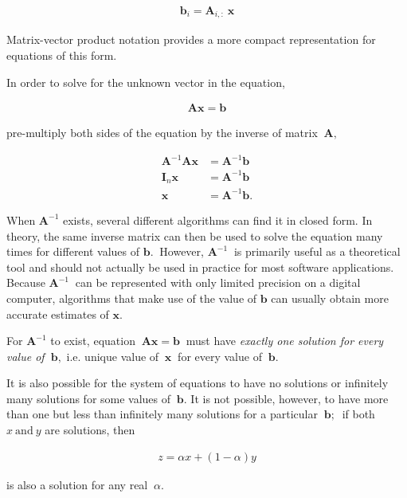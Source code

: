 \documentclass[12pt]{article}
\begin{document}
\begin{align}
\mathbf{b}_{i} = \mathbf{A}_{i,:}\ \mathbf{x}
\end{align}

Matrix-vector product notation provides a more compact representation for equations of this form.

In order to solve for the unknown vector in the equation,

\begin{align}
\mathbf{A}\mathbf{x}=\mathbf{b}
\end{align}

pre-multiply both sides of the equation by the inverse of matrix $\ \mathbf{A},$

\begin{align}
\mathbf{A}^{-1}\mathbf{A}\mathbf{x}& =\mathbf{A}^{-1}\mathbf{b}\\
\mathbf{I}_{n}\mathbf{x}& =\mathbf{A}^{-1}\mathbf{b}\\
\mathbf{x}& =\mathbf{A}^{-1}\mathbf{b}.
\end{align}

When $\mathbf{A}^{-1}$ exists, several different algorithms can find it in closed form. In theory, the same inverse matrix can then be used to solve the equation many times for different values of $\mathbf{b}.\ $ However, $\mathbf{A}^{-1}\ $ is primarily useful as a theoretical tool and should not actually be used in practice for most software applications. Because $\mathbf{A}^{-1}\ $ can be represented with only limited precision on a digital computer, algorithms that make use of the value of $\mathbf{b}$ can usually obtain more accurate estimates of $\mathbf{x}$.

For $\mathbf{A}^{-1}$ to exist, equation $\ \mathbf{A}\mathbf{x}=\mathbf{b}\ $ must have \textit{exactly one solution for every value of $\ \mathbf{b},$} i.e. unique value of $\ \mathbf{x}\ $ for every value of $\ \mathbf{b}.$

It is also possible for the system of equations to have no solutions or infinitely many solutions for some values of $\ \mathbf{b}.$ It is not possible, however, to have more than one but less than infinitely many solutions for a particular $\ \mathbf{b};\ $ if both $x\ \text{and}\ y$ are solutions, then

\begin{align}
z = \alpha{x} + (1 −\alpha){y}
\end{align}

is also a solution for any real $\ \alpha.$
\end{document}

